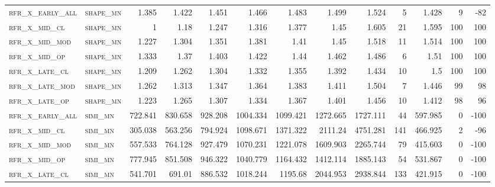 \begin{landscape}
\begin{center}
\begin{footnotesize}
\begin{longtable}{llrrrrrrrr|rrr}
\textsc{rfr\_x\_early\_all} & \textsc{shape\_mn }   & 1.385   & 1.422   & 1.451   & 1.466    & 1.483    & 1.499    & 1.524    & 5      & 1.428         & 9             & -82             \\
\textsc{rfr\_x\_mid\_cl   } & \textsc{shape\_mn }   & 1       & 1.18    & 1.247   & 1.316    & 1.377    & 1.45     & 1.605    & 21     & 1.595         & 100           & 100             \\
\textsc{rfr\_x\_mid\_mod  } & \textsc{shape\_mn }   & 1.227   & 1.304   & 1.351   & 1.381    & 1.41     & 1.45     & 1.518    & 11     & 1.514         & 100           & 100             \\
\textsc{rfr\_x\_mid\_op   } & \textsc{shape\_mn }   & 1.333   & 1.37    & 1.403   & 1.422    & 1.44     & 1.462    & 1.486    & 6      & 1.51          & 100           & 100             \\
\textsc{rfr\_x\_late\_cl  } & \textsc{shape\_mn }   & 1.209   & 1.262   & 1.304   & 1.332    & 1.355    & 1.392    & 1.434    & 10     & 1.5           & 100           & 100             \\
\textsc{rfr\_x\_late\_mod } & \textsc{shape\_mn }   & 1.262   & 1.313   & 1.347   & 1.364    & 1.383    & 1.411    & 1.504    & 7      & 1.446         & 99            & 98              \\
\textsc{rfr\_x\_late\_op  } & \textsc{shape\_mn }   & 1.223   & 1.265   & 1.307   & 1.334    & 1.367    & 1.401    & 1.456    & 10     & 1.412         & 98            & 96              \\
\textsc{rfr\_x\_early\_all} & \textsc{simi\_mn  }   & 722.841 & 830.658 & 928.208 & 1004.334 & 1099.421 & 1272.665 & 1727.111 & 44     & 597.985       & 0             & -100            \\
\textsc{rfr\_x\_mid\_cl   } & \textsc{simi\_mn  }   & 305.038 & 563.256 & 794.924 & 1098.671 & 1371.322 & 2111.24  & 4751.281 & 141    & 466.925       & 2             & -96             \\
\textsc{rfr\_x\_mid\_mod  } & \textsc{simi\_mn  }   & 557.533 & 764.128 & 927.479 & 1070.231 & 1221.078 & 1609.903 & 2265.744 & 79     & 415.603       & 0             & -100            \\
\textsc{rfr\_x\_mid\_op   } & \textsc{simi\_mn  }   & 777.945 & 851.508 & 946.322 & 1040.779 & 1164.432 & 1412.114 & 1885.143 & 54     & 531.867       & 0             & -100            \\
\textsc{rfr\_x\_late\_cl  } & \textsc{simi\_mn  }   & 541.701 & 691.01  & 886.532 & 1018.244 & 1195.68  & 2044.953 & 2938.844 & 133    & 421.915       & 0             & -100            \\

\end{longtable}
\end{footnotesize}
\end{center}
\end{landscape}
